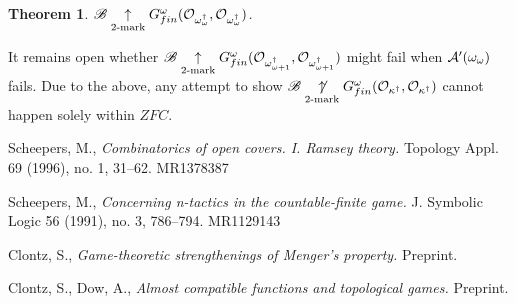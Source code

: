 \documentclass{amsart}
\newtheorem{theorem}{Theorem}[section]
\begin{document}
\begin{theorem}
  \(
    \mathscr{B}
      \underset{2\text{-mark}}{\uparrow}
    G^\omega_{fin}(
      \mathcal{O}_{\omega_\omega^\dagger}
    ,
      \mathcal{O}_{\omega_\omega^\dagger}
    )
  \).
\end{theorem}

It remains open whether
  \(
    \mathscr{B}
      \underset{2\text{-mark}}{\uparrow}
    G^\omega_{fin}(
      \mathcal{O}_{\omega_{\omega+1}^\dagger}
    ,
      \mathcal{O}_{\omega_{\omega+1}^\dagger}
    )
  \)
might fail when \(\mathcal{A}'(\omega_\omega)\) fails. Due to the above,
any attempt to show
  \(
    \mathscr{B}
      \underset{2\text{-mark}}{\not\uparrow}
    G^\omega_{fin}(
      \mathcal{O}_{\kappa^\dagger}
    ,
      \mathcal{O}_{\kappa^\dagger}
    )
  \)
cannot happen solely within \(ZFC\).

\begin{thebibliography}{AL}

 Scheepers, M.,
{\em Combinatorics of open covers. I. Ramsey theory.}
Topology Appl. 69 (1996), no. 1, 31–62. MR1378387

 Scheepers, M.,
{\em Concerning n-tactics in the countable-finite game.}
J. Symbolic Logic 56 (1991), no. 3, 786–794. MR1129143

 Clontz, S.,
\textit{Game-theoretic strengthenings of Menger's property.}
Preprint.

 Clontz, S., Dow, A.,
\textit{Almost compatible functions and topological games.}
Preprint.

\end{thebibliography}
\end{document}
